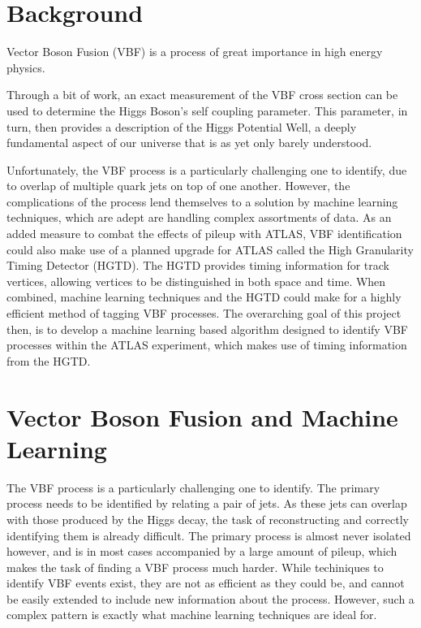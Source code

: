 \documentclass[paper=a4,fontsize=12pt]{article}
\begin{document}
\section*{Background}
    Vector Boson Fusion (VBF) is a process of great importance in high energy physics.

    Through a bit of work, an exact measurement of the VBF cross section can be used to determine the Higgs Boson's self coupling parameter. This parameter, in turn, then provides a description of the Higgs Potential Well, a deeply fundamental aspect of our universe that is as yet only barely understood. %

    Unfortunately, the VBF process is a particularly challenging one to identify, due to overlap of multiple quark jets on top of one another. However, the complications of the process lend themselves to a solution by machine learning techniques, which are adept are handling complex assortments of data. As an added measure to combat the effects of pileup with ATLAS, VBF identification could also make use of a planned upgrade for ATLAS called the High Granularity Timing Detector (HGTD). The HGTD provides timing information for track vertices, allowing vertices to be distinguished in both space and time. When combined, machine learning techniques and the HGTD could make for a highly efficient method of tagging VBF processes. The overarching goal of this project then, is to develop a machine learning based algorithm designed to identify VBF processes within the ATLAS experiment, which makes use of timing information from the HGTD.



\section*{Vector Boson Fusion and Machine Learning}
    The VBF process is a particularly challenging one to identify. The primary process needs to be identified by relating a pair of jets. As these jets can overlap with those produced by the Higgs decay, the task of reconstructing and correctly identifying them is already difficult. The primary process is almost never isolated however, and is in most cases accompanied by a large amount of pileup, which makes the task of finding a VBF process much harder. While techiniques to identify VBF events exist, they are not as efficient as they could be, and cannot be easily extended to include new information about the process. However, such a complex pattern is exactly what machine learning techniques are ideal for. 
\end{document}
